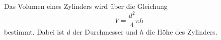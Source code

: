 Das Volumen eines Zylinders wird über die Gleichung
\begin{equation}
    \label{eqn:Z}
    V=\frac{d^2}{4}\pi h
\end{equation}
bestimmt. Dabei ist $d$ der Durchmesser und $h$ die Höhe des Zylinders.



